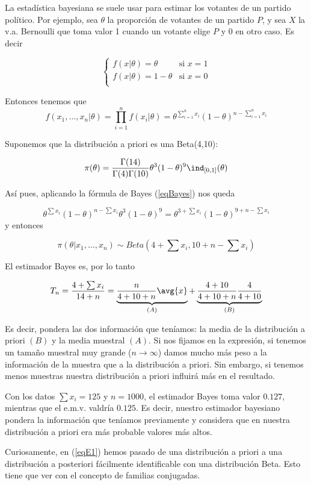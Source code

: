 \documentclass{apuntes}
\begin{document}
La estadística bayesiana se suele usar para estimar los votantes de un partido político. Por ejemplo, sea $\theta$ la proporción de votantes de un partido $P$, y sea $X$ la v.a. Bernoulli que toma valor 1 cuando un votante elige $P$ y 0 en otro caso. Es decir

\[ \begin{cases}
f(x|\theta) = \theta &\text{si } x=1 \\
f(x|\theta) = 1 - \theta &\text{si } x=0 \\
\end{cases} \]

Entonces tenemos que \[ f(x_1,\dotsc,x_n|\theta) = \prod_{i=1}^n f(x_i|\theta) = \theta^{\sum_{i=1}^n x_i} (1-\theta)^{n -\sum_{i=1}^n x_i} \]

Suponemos que la distribución a priori es una Beta(4,10):

\[ \pi(\theta) = \frac{\Gamma(14)}{\Gamma(4)\Gamma(10)}\theta^3(1-\theta)^9\ind_{[0,1]}(\theta) \]

Así pues, aplicando la fórmula de Bayes (\ref{eqBayes}) nos queda 

\begin{equation}\label{eqE1}
\theta^{\sum x_i}(1-\theta)^{n-\sum x_i} \theta^3 (1-\theta)^9 = \theta^{3+\sum x_i} (1-\theta)^{ 9 + n - \sum x_i} 
\end{equation} y entonces

\[  \pi(\theta | x_1,\dotsc,x_n)  \sim Beta(4 + \sum x_i, 10 + n - \sum x_i) \]

El estimador Bayes es, por lo tanto

\[ T_n = \frac{4 + \sum x_i}{14 + n} = \underbrace{\frac{n}{4 + 10 + n}\avg{x}}_{(A)} + \underbrace{\frac{4+10}{4+10+n}\frac{4}{4+10}}_{(B)} \]

Es decir, pondera las dos información que teníamos: la media de la distribución a priori $(B)$ y la media muestral $(A)$. Si nos fijamos en la expresión, si tenemos un tamaño muestral muy grande ($n\to\infty$) damos mucho más peso a la información de la muestra que a la distribución a priori. Sin embargo, si tenemos menos muestras nuestra distribución a priori influirá más en el resultado.

Con los datos $\sum x_i = 125$ y $n = 1000$, el estimador Bayes toma valor $0.127$, mientras que el e.m.v. valdría $0.125$. Es decir, nuestro estimador bayesiano pondera la información que teníamos previamente y considera que en nuestra distribución a priori era más probable valores más altos.

Curiosamente, en (\ref{eqE1}) hemos pasado de una distribución a priori a una distribución a posteriori fácilmente identificable con una distribución Beta. Esto tiene que ver con el concepto de familias conjugadas.
\end{document}
